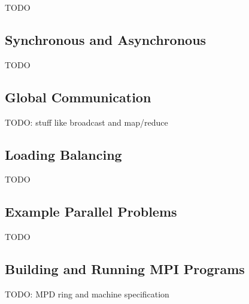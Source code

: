 \documentclass{article}
\begin{document}
TODO

\subsection{Synchronous and Asynchronous}

TODO

\subsection{Global Communication}

TODO: stuff like broadcast and map/reduce

\subsection{Loading Balancing}

TODO

\subsection{Example Parallel Problems}

TODO

\subsection{Building and Running MPI Programs}

TODO: MPD ring and machine specification



\end{document}
